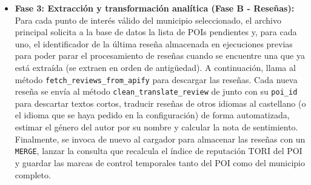 
\begin{itemize}
	\item \textbf{Fase 3: Extracción y transformación analítica (Fase B - Reseñas):} Para cada punto de interés válido del municipio seleccionado, el archivo principal solicita a la base de datos la lista de POIs pendientes y, para cada uno, el identificador de la última reseña almacenada en ejecuciones previas para poder parar el procesamiento de reseñas cuando se encuentre una que ya está extraída (se extraen en orden de antigüedad). A continuación, llama al método \texttt{fetch\_reviews\_from\_apify} para descargar las reseñas. Cada nueva reseña se envía al método \texttt{clean\_translate\_review} de  junto con su \texttt{poi\_id} para descartar textos cortos, traducir reseñas de otros idiomas al castellano (o el idioma que se haya pedido en la configuración) de forma automatizada, estimar el género del autor por su nombre y calcular la nota de sentimiento. Finalmente, se invoca de nuevo al cargador para almacenar las reseñas con un \texttt{MERGE}, lanzar la consulta que recalcula el índice de reputación TORI del POI y guardar las marcas de control temporales tanto del POI como del municipio completo.
\end{itemize}



